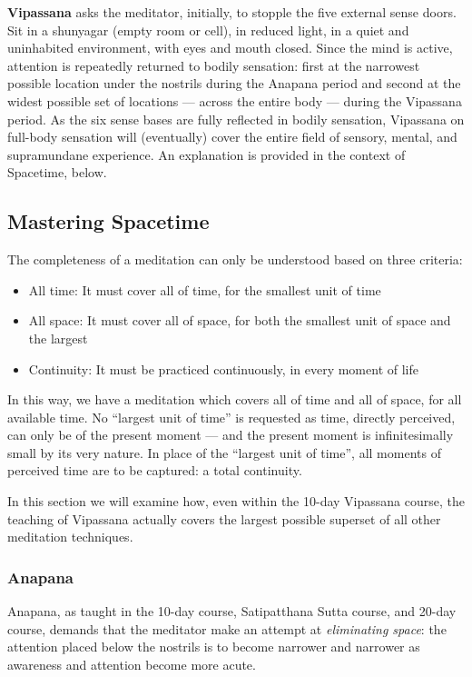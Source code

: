 \documentclass[a4paper, amsfonts, amssymb, amsmath, reprint, showkeys, nofootinbib, twoside]{revtex4-1}
\begin{document}
\textbf{Vipassana} asks the meditator, initially, to stopple the five external sense
doors. Sit in a shunyagar (empty room or cell), in reduced light, in a quiet and uninhabited
environment, with eyes and mouth closed. Since the mind is active, attention is
repeatedly returned to bodily sensation: first at the narrowest possible location
under the nostrils during the Anapana period and second at the widest possible set of
locations --- across the entire body --- during the Vipassana period. As the six
sense bases are fully reflected in bodily sensation, Vipassana on full-body sensation
will (eventually) cover the entire field of sensory, mental, and supramundane
experience. An explanation is provided in the context of Spacetime, below.

\subsection{Mastering Spacetime}

The completeness of a meditation can only be understood based on three criteria:

\begin{itemize}
  \item All time: It must cover all of time, for the smallest unit of time
  \item All space: It must cover all of space, for both the smallest unit of space and the largest
  \item Continuity: It must be practiced continuously, in every moment of life
\end{itemize}

In this way, we have a meditation which covers all of time and all of space, for all
available time. No ``largest unit of time'' is requested as time, directly perceived,
can only be of the present moment --- and the present moment is infinitesimally small
by its very nature. In place of the ``largest unit of time'', all moments of
perceived time are to be captured: a total continuity.

In this section we will examine how, even within the 10-day Vipassana course, the
teaching of Vipassana actually covers the largest possible superset of all other
meditation techniques.

\subsubsection{Anapana}

Anapana, as taught in the 10-day course, Satipatthana Sutta course, and 20-day
course, demands that the meditator make an attempt at \textit{eliminating space}: the
attention placed below the nostrils is to become narrower and narrower as awareness
and attention become more acute.
\end{document}
